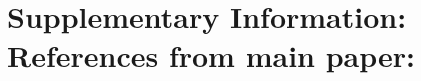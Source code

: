 \pagebreak 
\onecolumn
\pagebreak 
\onecolumn
\section{Supplementary Information: References from main paper:}
\pagebreak 
\onecolumn
\pagebreak 
\onecolumn
\renewcommand{\figurename}{Supplementary Fig.}
\renewcommand{\tablename}{Supplementary Table.}
\setcounter{figure}{0}
\setcounter{table}{0}
\setcounter{section}{0}

%
